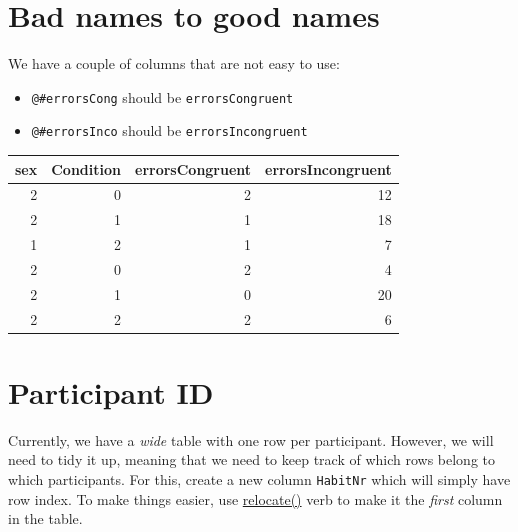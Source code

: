 \documentclass[
]{book}
\providecommand{\tightlist}{%
  \setlength{\itemsep}{0pt}\setlength{\parskip}{0pt}}
\begin{document}
\hypertarget{bad-names-to-good-names}{%
\section{Bad names to good names}\label{bad-names-to-good-names}}

We have a couple of columns that are not easy to use:

\begin{itemize}
\tightlist
\item
  \texttt{@\#errorsCong} should be \texttt{errorsCongruent}
\item
  \texttt{@\#errorsInco} should be \texttt{errorsIncongruent}
\end{itemize}

\begin{tabular}{r|r|r|r}
\hline
sex & Condition & errorsCongruent & errorsIncongruent\\
\hline
2 & 0 & 2 & 12\\
\hline
2 & 1 & 1 & 18\\
\hline
1 & 2 & 1 & 7\\
\hline
2 & 0 & 2 & 4\\
\hline
2 & 1 & 0 & 20\\
\hline
2 & 2 & 2 & 6\\
\hline
\end{tabular}

\hypertarget{participant-id}{%
\section{Participant ID}\label{participant-id}}

Currently, we have a \emph{wide} table with one row per participant. However, we will need to tidy it up, meaning that we need to keep track of which rows belong to which participants. For this, create a new column \texttt{HabitNr} which will simply have row index. To make things easier, use \href{https://dplyr.tidyverse.org/reference/relocate.html}{relocate()} verb to make it the \emph{first} column in the table.
\end{document}
